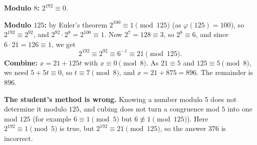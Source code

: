 \textbf{Modulo $8$:} $2^{192}\equiv0$.

\textbf{Modulo $125$:} by Euler's theorem $2^{100}\equiv1\pmod{125}$ (as $\varphi(125)=100$), so $2^{192}\equiv2^{92}$, and $2^{92}\cdot2^{8}=2^{100}\equiv1$. Now $2^7=128\equiv3$, so $2^8\equiv6$, and since $6\cdot21=126\equiv1$, we get
\[
2^{192}\equiv2^{92}\equiv6^{-1}\equiv21\pmod{125}.
\]
\textbf{Combine:} $x=21+125t$ with $x\equiv0\pmod8$. As $21\equiv5$ and $125\equiv5\pmod8$, we need $5+5t\equiv0$, so $t\equiv7\pmod8$, and $x=21+875=896$. The remainder is $\boxed{896}$.

\textbf{The student's method is wrong.} Knowing a number modulo $5$ does not determine it modulo $125$, and cubing does not turn a congruence mod $5$ into one mod $125$ (for example $6\equiv1\pmod5$ but $6\not\equiv1\pmod{125}$). Here $2^{192}\equiv1\pmod5$ is true, but $2^{192}\equiv21\pmod{125}$, so the answer $376$ is incorrect.
